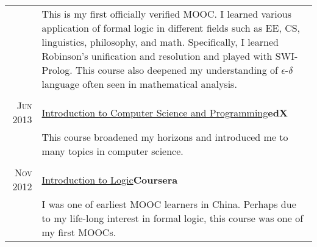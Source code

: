 \documentclass[a4paper,11pt]{article}
\begin{document}
\begin{tabular}{rp{11.6cm}}
                     & \footnotesize This is my first officially verified MOOC\@.  I learned various application of formal logic in different fields such as EE, CS, linguistics, philosophy, and math.  Specifically, I learned Robinson's unification and resolution and played with SWI-Prolog.  This course also deepened my understanding of \(\epsilon\textit{-}\delta\) language often seen in mathematical analysis.\\&\\
  \textsc{Jun 2013}  & \href{https://s3.amazonaws.com/verify.edx.org/downloads/eedec1d10b884139876bee106313142c/Certificate.pdf}{Introduction to Computer Science and Programming}\hfill\textbf{edX}\\
                     & \footnotesize This course broadened my horizons and introduced me to many topics in computer science.\\&\\
  \textsc{Nov 2012}  & \href{https://s3.amazonaws.com/accredible_user_certificate/certificates/48300/original/IntroLogic.pdf}{Introduction to Logic}\hfill\textbf{Coursera}\\
                     & I was one of earliest MOOC learners in China.  Perhaps due to my life-long interest in formal logic, this course was one of my first MOOCs.
\end{tabular}
\end{document}

